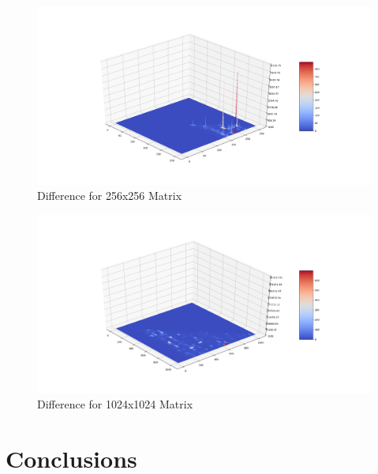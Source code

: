 \documentclass[12pt]{article}
\begin{document}
\begin{figure}[H]
    \centering
    \includegraphics[width=\textwidth]{imgs/256.png}
    \caption{Difference for 256x256 Matrix}
\end{figure}

\begin{figure}[H]
    \centering
    \includegraphics[width=\textwidth]{imgs/1024.png}
    \caption{Difference for 1024x1024 Matrix}
\end{figure}

\section{Conclusions}
\end{document}
